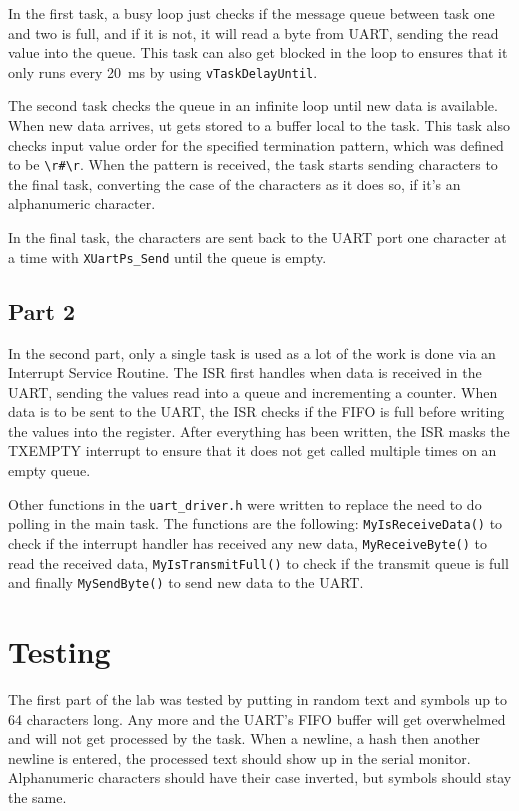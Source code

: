 \documentclass{article}
\begin{document}
In the first task, a busy loop just checks if the message queue between task one and two is full, and if it is not, it will read a byte from UART, sending the read value into the queue. This task can also get blocked in the loop to ensures that it only runs every \SI{20}{\milli\second} by using \verb|vTaskDelayUntil|.\@

The second task checks the queue in an infinite loop until new data is available. When new data arrives, ut gets stored to a buffer local to the task. This task also checks input value order for the specified termination pattern, which was defined to be \verb|\r#\r|. When the pattern is received, the task starts sending characters to the final task, converting the case of the characters as it does so, if it's an alphanumeric character.\@

In the final task, the characters are sent back to the UART port one character at a time with \verb|XUartPs_Send| until the queue is empty.

\subsection{Part 2}

In the second part, only a single task is used as a lot of the work is done via an Interrupt Service Routine. The ISR first handles when data is received in the UART, sending the values read into a queue and incrementing a counter. When data is to be sent to the UART, the ISR checks if the FIFO is full before writing the values into the register. After everything has been written, the ISR masks the TXEMPTY interrupt to ensure that it does not get called multiple times on an empty queue.

Other functions in the \verb|uart_driver.h| were written to replace the need to do polling in the main task. The functions are the following: \verb|MyIsReceiveData()| to check if the interrupt handler has received any new data, \verb|MyReceiveByte()| to read the received data, \verb|MyIsTransmitFull()| to check if the transmit queue is full and finally \verb|MySendByte()| to send new data to the UART.\@

\section{Testing}
The first part of the lab was tested by putting in random text and symbols up to 64 characters long. Any more and the UART's FIFO buffer will get overwhelmed and will not get processed by the task. When a newline, a hash then another newline is entered, the processed text should show up in the serial monitor. Alphanumeric characters should have their case inverted, but symbols should stay the same.
\end{document}
